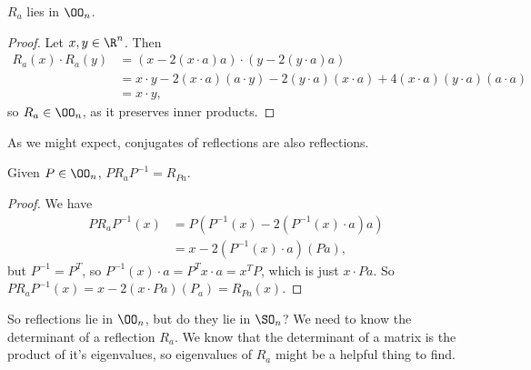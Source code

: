 \documentclass[a4]{scrreprt}
\begin{document}
\begin{definition}
\begin{center}

	\end{center}
\end{definition}

\begin{lemma}
	$R_a$ lies in $\OO_n$.
\end{lemma}
\begin{proof}
	Let $x, y \in \R^n$. Then
	\begin{align*}
		R_a(x) \cdot R_a(y) &= (x - 2(x \cdot a)a) \cdot (y - 2(y \cdot a)a) \\
		&= x \cdot y - 2(x \cdot a)(a \cdot y) - 2(y \cdot a)(x \cdot a) + 4(x \cdot a)(y \cdot a)(a \cdot a)\\
		&= x \cdot y,
	\end{align*}
	so $R_a \in \OO_n$, as it preserves inner products.
\end{proof}

As we might expect, conjugates of reflections are also reflections.

\begin{lemma}
	Given $P \in \OO_n$, $P R_a P^{-1} = R_{Pa}$.
\end{lemma}
\begin{proof}
	We have
	\begin{align*}
		P R_a P^{-1}(x) &= P(P^{-1}(x) - 2(P^{-1}(x) \cdot a)a) \\
		&= x - 2(P^{-1}(x) \cdot a)(P a),
	\end{align*}
	but $P^{-1} = P^T$, so $P^{-1}(x)\cdot a = P^T x \cdot a = x^T P$, which is just $x \cdot Pa$. So $P R_a P^{-1}(x) = x - 2(x\cdot Pa)(P_a) = R_{Pa}(x)$.
\end{proof}


So reflections lie in $\OO_n$, but do they lie in $\SO_n$? We need to know the determinant of a reflection $R_a$. We know that the determinant of a matrix is the product of it's eigenvalues, so eigenvalues of $R_a$ might be a helpful thing to find. 
\end{document}
